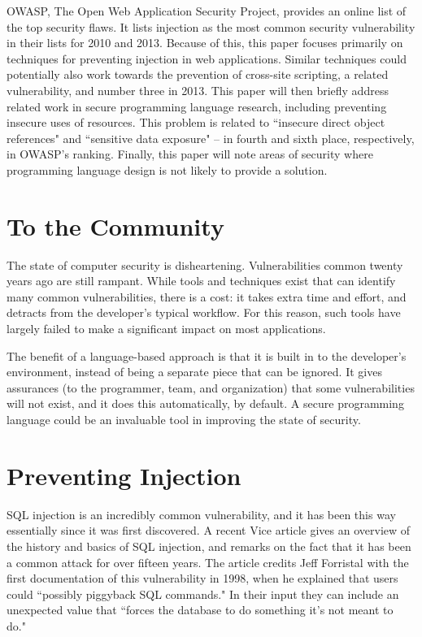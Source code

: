 \documentclass[twocolumn]{article}
\begin{document}
OWASP, The Open Web Application Security Project, provides an online list of the top security flaws.\cite{owasp10}  It lists injection as the most common security vulnerability in their lists for 2010 and 2013.  Because of this, this paper focuses primarily on techniques for preventing injection in web applications.  Similar techniques could potentially also work towards the prevention of cross-site scripting, a related vulnerability, and number three in 2013.  This paper will then briefly address related work in secure programming language research, including preventing insecure uses of resources.  This problem is related to ``insecure direct object references" and ``sensitive data exposure" – in fourth and sixth place, respectively, in OWASP's ranking.  Finally, this paper will note areas of security where programming language design is not likely to provide a solution.


\section{To the Community}
The state of computer security is disheartening.  Vulnerabilities common twenty years ago are still rampant.  While tools and techniques exist that can identify many common vulnerabilities, there is a cost: it takes extra time and effort, and detracts from the developer's typical workflow.   For this reason, such tools have largely failed to make a significant impact on most applications.

The benefit of a language-based approach is that it is built in to the developer's environment, instead of being a separate piece that can be ignored.  It gives assurances (to the programmer, team, and organization) that some vulnerabilities will not exist, and it does this automatically, by default.  A secure programming language could be an invaluable tool in improving the state of security.


\section{Preventing Injection}
SQL injection is an incredibly common vulnerability, and it has been this way essentially since it was first discovered.  A recent Vice article gives an overview of the history and basics of SQL injection, and remarks on the fact that it has been a common attack for over fifteen years.\cite{injectionhistory2015}  The article credits Jeff Forristal with the first documentation of this vulnerability in 1998, when he explained that users could ``possibly piggyback SQL commands."  In their input they can include an unexpected value that ``forces the database to do something it's not meant to do."\cite{injectionhistory2015}
\end{document}
